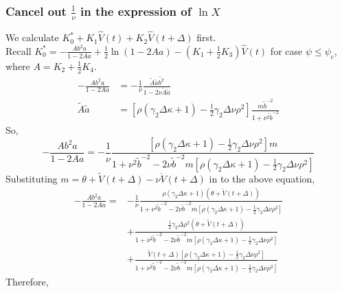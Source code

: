 \documentclass{ws-ijfe}
\begin{document}
\subsubsection{Cancel out $\frac{1}{\nu}$ in the expression of $\ln X$}
We calculate $K_0^*+K_1\hat{V}(t)+K_2\hat{V}(t+\Delta)$ first. \\
Recall $K_0^*= -\frac{Ab^2a}{1-2Aa}+\frac{1}{2}\ln(1-2Aa)-(K_1+\frac{1}{2}K_3)\hat{V}(t)$ for case $\psi\leq\psi_c$, where $A=K_2+\frac{1}{2}K_4$.
\begin{align*}
  -\frac{Ab^2a}{1-2Aa} &= -\frac{1}{\nu}\frac{\tilde{A}\tilde{a}\tilde{b^2}}{1-2\nu\tilde{A}\tilde{a}}\\
  \tilde{A}\tilde{a}&= [\rho(\gamma_2\Delta\kappa+1)-\frac{1}{2}\gamma_2\Delta\nu\rho^2]\frac{m\tilde{b}^{-2}}{1+\nu^2\tilde{b}^{-2}}
\end{align*}
So,
\begin{equation*}
  -\frac{Ab^2a}{1-2Aa}=-\frac{1}{\nu}\frac{[\rho(\gamma_2\Delta\kappa+1)-\frac{1}{2}\gamma_2\Delta\nu\rho^2]m}{1+\nu^2\tilde{b}^{-2}-2\nu\tilde{b}^{-2}m[\rho(\gamma_2\Delta\kappa+1)-\frac{1}{2}\gamma_2\Delta\nu\rho^2]}
\end{equation*}
Substituting $m=\theta+\tilde{V}(t+\Delta)-\nu\mathring{V}(t+\Delta)$ in to the above equation,
\begin{equation*}
\begin{split}
  -\frac{Ab^2a}{1-2Aa}=&-\frac{1}{\nu}\frac{\rho(\gamma_2\Delta\kappa+1)(\theta+\tilde{V}(t+\Delta))}{1+\nu^2\tilde{b}^{-2}-2\nu\tilde{b}^{-2}m[\rho(\gamma_2\Delta\kappa+1)-\frac{1}{2}\gamma_2\Delta\nu\rho^2]}\\
  &+\frac{\frac{1}{2}\gamma_2\Delta\rho^2(\theta+\tilde{V}(t+\Delta))}{1+\nu^2\tilde{b}^{-2}-2\nu\tilde{b}^{-2}m[\rho(\gamma_2\Delta\kappa+1)-\frac{1}{2}\gamma_2\Delta\nu\rho^2]}\\
  &+\frac{\mathring{V}(t+\Delta)[\rho(\gamma_2\Delta\kappa+1)-\frac{1}{2}\gamma_2\Delta\nu\rho^2]}{1+\nu^2\tilde{b}^{-2}-2\nu\tilde{b}^{-2}m[\rho(\gamma_2\Delta\kappa+1)-\frac{1}{2}\gamma_2\Delta\nu\rho^2]}
\end{split}
\end{equation*}
Therefore,
\end{document}
